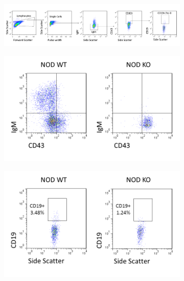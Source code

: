 \begin{figure}
	\begin{subfigure}{\textwidth}
	\caption{}
	\includegraphics[width=\textwidth]{Figures/MatBincreasesthyProBgating.pdf}
	\label{subfig:MatBincreasesthyProBgating}
	\end{subfigure}
	\begin{subfigure}{0.5\textwidth}
	\caption{}
	\includegraphics[width=\textwidth]{Figures/NODvKOBM.png}
	\label{subfig:KOBM}
	\end{subfigure}
	\hfill
	\begin{subfigure}{0.5\textwidth}
	\caption{}
	\includegraphics[width=\textwidth]{Figures/NODvKOproBcells.png}
	\label{subfig:ThyProBcells}
	\end{subfigure}

\end{figure}
